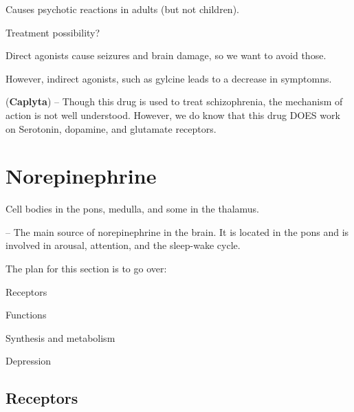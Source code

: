 \begin{coloredlist}
\begin{coloredlist}
        \begin{coloredlist}
            \item Causes psychotic reactions in adults (but not children).
        \end{coloredlist}
        \item Treatment possibility?
        \begin{coloredlist}
            \item Direct agonists cause seizures and brain damage, so we want to avoid those. 
            \item However, indirect agonists, such as gylcine leads to a decrease in symptomns.
            \item {} (\textbf{Caplyta}) -- Though this drug is used to treat schizophrenia, the mechanism of action is not well understood. However, we do know that this drug DOES work on Serotonin, dopamine, and glutamate receptors.
        \end{coloredlist}
    \end{coloredlist}
\end{coloredlist}

\section{Norepinephrine}

\begin{coloredlist}
    \item Cell bodies in the pons, medulla, and some in the thalamus.
    \item {} -- The main source of norepinephrine in the brain. It is located in the pons and is involved in arousal, attention, and the sleep-wake cycle.
    \item The plan for this section is to go over:
    \begin{coloredlist}
        \item Receptors
        \item Functions
        \item Synthesis and metabolism
        \item Depression
    \end{coloredlist}
\end{coloredlist}

\subsection{Receptors}

